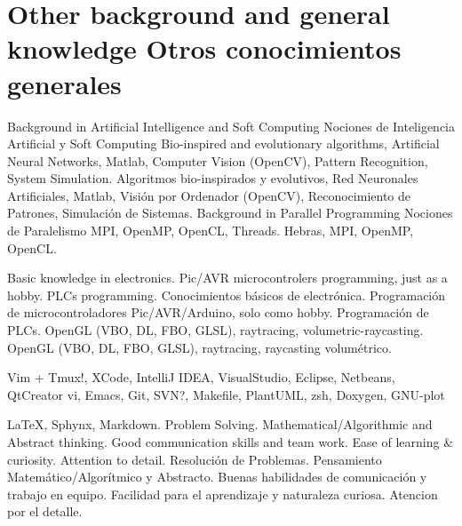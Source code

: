 \section{\ml
    {Other background and general knowledge}
    {Otros conocimientos generales}}

\cvcomputer
    {\ml
    {Background in Artificial Intelligence and Soft Computing}
    {Nociones de Inteligencia Artificial y Soft Computing}}
        {\ml
        {Bio-inspired and evolutionary algorithms, Artificial Neural Networks,
        Matlab, Computer Vision (OpenCV), Pattern Recognition, System
        Simulation.}
        {Algoritmos bio-inspirados y evolutivos, Red Neuronales Artificiales,
        Matlab, Visión por Ordenador (OpenCV), Reconocimiento de Patrones,
        Simulación de Sistemas.}}
    {\ml
    {Background in Parallel Programming}
    {Nociones de Paralelismo}}
        {\ml
        {MPI, OpenMP, OpenCL, Threads.}
        {Hebras, MPI, OpenMP, OpenCL.}}


\cvcomputer
    {}
        {\ml
        {Basic knowledge in electronics. Pic/AVR microcontrolers programming,
        just as a hobby. PLCs programming.}
        {Conocimientos básicos de electrónica. Programación de
        microcontroladores Pic/AVR/Arduino, solo como hobby. Programación de
        PLCs.}}
    {}
        {\ml
        {OpenGL (VBO, DL, FBO, GLSL), raytracing, volumetric-raycasting.}
        {OpenGL (VBO, DL, FBO, GLSL), raytracing, raycasting volumétrico.}}


\cvcomputer
    {}
        {Vim + Tmux!, XCode, IntelliJ IDEA, VisualStudio, Eclipse, Netbeans,
        QtCreator}
    {}
        {vi, Emacs, Git, SVN?, Makefile, PlantUML, zsh, Doxygen, GNU-plot}

\cvcomputer
    {}
        {\LaTeX, Sphynx, Markdown.}
    {}
        {\ml
        {Problem Solving. Mathematical/Algorithmic and Abstract thinking. Good
        communication skills and team work. Ease of learning \& curiosity.
        Attention to detail.}
        {Resolución de Problemas. Pensamiento Matemático/Algorítmico y
        Abstracto. Buenas habilidades de comunicación y trabajo en equipo.
        Facilidad para el aprendizaje y naturaleza curiosa. Atencion por el detalle.}}
